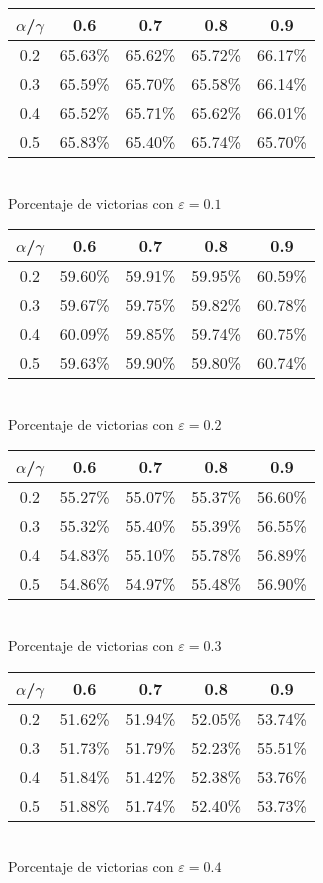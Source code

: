 \begin{center}
\begin{tabular}{|c||c|c|c|c|}
	\hline
	$\alpha$/$\gamma$& 0.6 & 0.7 & 0.8 & 0.9\\
	\hline
	\hline
	0.2 & 65.63\% & 65.62\% & 65.72\% & \cellcolor{intvier}66.17\% \\
	\hline
	0.3 & 65.59\% & 65.70\% & 65.58\% & 66.14\% \\
	\hline
	0.4 & 65.52\% & 65.71\% & 65.62\% & 66.01\% \\
	\hline
	0.5 & 65.83\% & 65.40\% & 65.74\% & 65.70\% \\
	\hline
\end{tabular}\\
Porcentaje de victorias con $\varepsilon=0.1$
\end{center}
\begin{center}
\begin{tabular}{|c||c|c|c|c|}
	\hline
	$\alpha$/$\gamma$& 0.6 & 0.7 & 0.8 & 0.9\\
	\hline
	\hline
	0.2 & 59.60\% & 59.91\% & 59.95\% & 60.59\% \\
	\hline
	0.3 & 59.67\% & 59.75\% & 59.82\% & \cellcolor{intvier}60.78\% \\
	\hline
	0.4 & 60.09\% & 59.85\% & 59.74\% & 60.75\% \\
	\hline
	0.5 & 59.63\% & 59.90\% & 59.80\% & 60.74\% \\
	\hline
\end{tabular}\\
Porcentaje de victorias con $\varepsilon=0.2$
\end{center}
\begin{center}
\begin{tabular}{|c||c|c|c|c|}
	\hline
    $\alpha$/$\gamma$& 0.6 & 0.7 & 0.8 & 0.9\\
	\hline
	\hline
	0.2 & 55.27\% & 55.07\% & 55.37\% & 56.60\% \\
	\hline
	0.3 & 55.32\% & 55.40\% & 55.39\% & 56.55\% \\
	\hline
	0.4 & 54.83\% & 55.10\% & 55.78\% & 56.89\% \\
	\hline
	0.5 & 54.86\% & 54.97\% & 55.48\% & \cellcolor{intvier}56.90\% \\
	\hline
\end{tabular}\\
Porcentaje de victorias con $\varepsilon=0.3$
\end{center}
\begin{center}
\begin{tabular}{|c||c|c|c|c|}
	\hline
	$\alpha$/$\gamma$& 0.6 & 0.7 & 0.8 & 0.9\\
	\hline
	\hline
	0.2 & 51.62\% & 51.94\% & 52.05\% & 53.74\% \\
	\hline
	0.3 & 51.73\% & 51.79\% & 52.23\% & 55.51\% \\
	\hline
	0.4 & 51.84\% & 51.42\% & 52.38\% & \cellcolor{intvier}53.76\% \\
	\hline
	0.5 & 51.88\% & 51.74\% & 52.40\% & 53.73\% \\
	\hline
\end{tabular}\\
Porcentaje de victorias con $\varepsilon=0.4$
\end{center}


